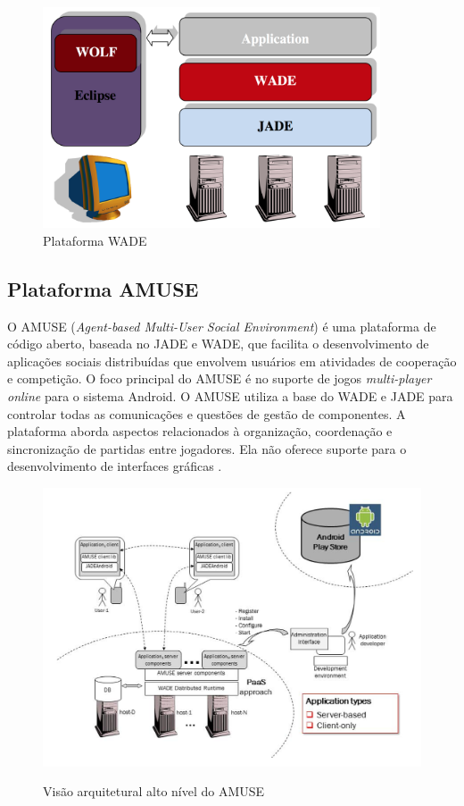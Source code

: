 \begin{figure}[h]
  \centering
  \includegraphics[width=10cm]{figuras/wade}
  \caption{Plataforma WADE \cite{wadeUserGuide}}
  \label{figura:wade}
\end{figure}

    \subsection{Plataforma AMUSE}

O AMUSE (\textit{Agent-based Multi-User Social Environment}) é uma plataforma de
código aberto, baseada no JADE e WADE, que facilita o desenvolvimento de
aplicações sociais distribuídas que envolvem usuários em atividades de
cooperação e competição. O foco principal do AMUSE é no suporte de jogos
\textit{multi-player online} para o sistema Android. O AMUSE utiliza a base do
WADE e JADE para controlar todas as comunicações e questões de gestão de
componentes. A plataforma aborda aspectos relacionados à organização,
coordenação e sincronização de partidas entre jogadores. Ela não oferece suporte
para o desenvolvimento de interfaces gráficas \cite{amuse}.

\begin{figure}[h]
  \centering
  \includegraphics[width=13cm]{figuras/amuse_architecture}
  \caption{Visão arquitetural alto nível do AMUSE}
  \cite{bergenti2015}
  \label{figura:amuse_architecture}
\end{figure}

